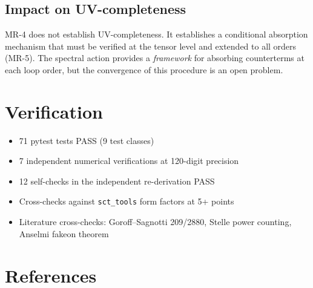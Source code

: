 \documentclass[12pt,a4paper]{article}
\begin{document}
\subsection{Impact on UV-completeness}

MR-4 does not establish UV-completeness. It establishes a conditional
absorption mechanism that must be verified at the tensor level and
extended to all orders (MR-5). The spectral action provides a
\emph{framework} for absorbing counterterms at each loop order, but
the convergence of this procedure is an open problem.

\section*{Verification}

\begin{itemize}
  \item 71 pytest tests PASS (9 test classes)
  \item 7 independent numerical verifications at 120-digit precision
  \item 12 self-checks in the independent re-derivation PASS
  \item Cross-checks against \texttt{sct\_tools} form factors at 5+ points
  \item Literature cross-checks: Goroff--Sagnotti 209/2880, Stelle
    power counting, Anselmi fakeon theorem
\end{itemize}

\section*{References}
\end{document}
